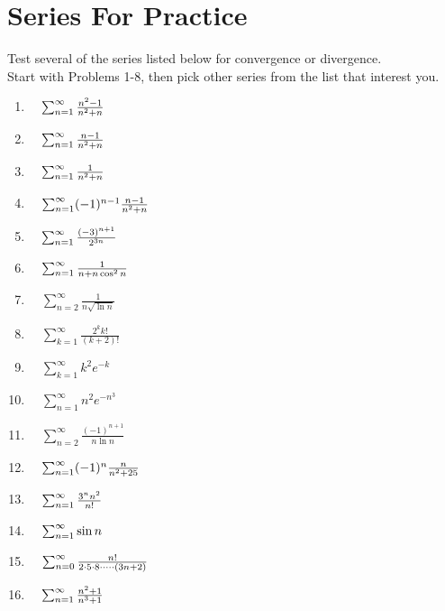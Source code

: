 \documentclass[10pt]{article}
\begin{document}
\section*{Series For Practice}
Test several of the series listed below for convergence or divergence.  \\
Start with Problems 1-8, then pick other series from the list that interest you.
\begin{enumerate}

\item \(\quad \sum_{n=1}^\infty \frac{n^2-1}{n^2+n}\)

\item \(\quad \sum_{n=1}^\infty \frac{n-1}{n^2+n}\)

\item \(\quad \sum_{n=1}^\infty \frac{1}{n^2+n}\)

\item \(\quad \sum_{n=1}^\infty (-1)^{n-1}\frac{n-1}{n^2+n}\)

\item \(\quad \sum_{n=1}^\infty \frac{(-3)^{n+1}}{2^{3n}}\)

\item \(\quad \sum_{n=1}^\infty \frac{1}{n+n \cos^2 n}\)

\item \(\quad \sum_{n=2}^\infty \frac{1}{n\sqrt{\ln n}}\)

\item \(\quad \sum_{k=1}^\infty \frac{2^k k!}{(k+2)!}\)

\item \(\quad \sum_{k=1}^\infty k^2 e^{-k}\)

\item \(\quad \sum_{n=1}^\infty n^2 e^{-n^3}\)

\item \(\quad \sum_{n=2}^\infty \frac{(-1)^{n+1}}{n \ln n}\)

\item \(\quad \sum_{n=1}^\infty (-1)^n \frac{n}{n^2+25}\)

\item \(\quad \sum_{n=1}^\infty \frac{3^n n^2}{n!}\)

\item \(\quad \sum_{n=1}^\infty \sin n\)

\item \(\quad \sum_{n=0}^\infty \frac{n!}{2\cdot5\cdot8\cdot \cdots \cdot(3n+2)}\)

\item \(\quad \sum_{n=1}^\infty \frac{n^2+1}{n^3+1}\)


\end{enumerate}
\end{document}
